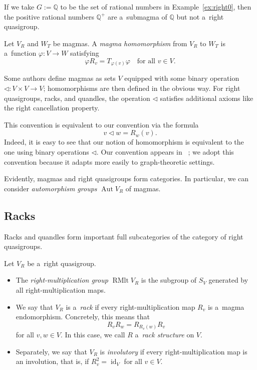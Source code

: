 \documentclass{jonasart}
\DeclareMathOperator{\Aut}{Aut}
\DeclareMathOperator{\id}{id}
\DeclareMathOperator{\RMlt}{RMlt}
\newcommand{\Q}{\mathbb{Q}}
\newcommand{\tr}{\triangleleft}
\begin{document}
	\begin{example}\label{ex:right}
		If we take $G:=\Q$ to be the set of rational numbers in Example~\ref{ex:right0}, then the positive rational numbers $\Q^+$ are a~submagma of $\Q$ but not a~right quasigroup.
	\end{example}

	\begin{definition}
		Let $V_R$ and $W_T$ be magmas. A \emph{magma homomorphism} from $V_R$ to $W_T$ is a~function $\varphi:V\to W$ satisfying
		\[
            \varphi R_v=T_{\varphi(v)}\varphi
            \quad \text{for all } v \in V.
		\]
	\end{definition}

	\begin{remark}
		Some authors define magmas as sets $V$ equipped with some binary operation $\tr:V\times V\to V$; homomorphisms are then defined in the obvious way. For right quasigroups, racks, and quandles, the operation $\tr$ satisfies additional axioms like the right cancellation property.

		This convention is equivalent to our convention via the formula
		\[
			v\tr w=R_w(v).
		\]
		Indeed, it is easy to see that our notion of homomorphism is equivalent to the one using binary operations $\tr$. Our convention appears in~ \cite{survey, virtual}; we adopt this convention because it adapts more easily to graph-theoretic settings.
	\end{remark}
    
	Evidently, magmas and right quasigroups form categories. In particular, we can consider \emph{automorphism groups} $\Aut V_R$ of magmas.

	\subsection{Racks}
    
	Racks and quandles form important full subcategories of the category of right quasigroups.

	\begin{definition}
		Let $V_R$ be a~right quasigroup.
		\begin{itemize}
			\item The \emph{right-multiplication group} $\RMlt V_R$ is the subgroup of $S_V$ generated by all right-multiplication maps.
			\item We say that $V_R$ is a~\emph{rack} if every right-multiplication map $R_v$ is a~magma endomorphism. Concretely, this means that
			\begin{equation}\label{eq:rack}
				R_v R_w = R_{R_v (w)}R_v
			\end{equation}
			for all $v,w\in V$. In this case, we call $R$ a~\emph{rack structure} on $V$.
			\item Separately, we say that $V_R$ is \emph{involutory} if every right-multiplication map is an involution, that is, if $R_v^2 =\id_V$ for all $v\in V$.
		\end{itemize}
	\end{definition}
\end{document}
